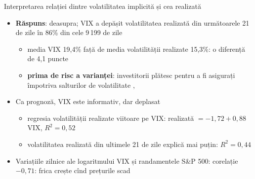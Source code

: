 \begin{frame}{Interpretarea relației dintre volatilitatea implicită și cea realizată}
\itemsize{\small}
\begin{itemize}
    \item \textbf{Răspuns}: deasupra; VIX a depășit volatilitatea realizată din următoarele 21 de zile în 86\% din cele 9\,199 de zile
    \begin{itemize}
        \item media VIX 19{,}4\% față de media volatilității realizate 15{,}3\%: o diferență de 4{,}1 puncte
        \item \textbf{prima de risc a varianței}: investitorii plătesc pentru a fi asigurați împotriva salturilor de volatilitate , 
    \end{itemize}
    \item Ca prognoză, VIX este informativ, dar deplasat
    \begin{itemize}
        \item regresia volatilității realizate viitoare pe VIX: realizată $= -1{,}72 + 0{,}88\,$VIX, $R^2 = 0{,}52$
        \item volatilitatea realizată din ultimele 21 de zile explică mai puțin: $R^2 = 0{,}44$
    \end{itemize}
    \item Variațiile zilnice ale logaritmului VIX și randamentele S\&P 500: corelație $-0{,}71$: frica crește cînd prețurile scad
\end{itemize}
\end{frame}

